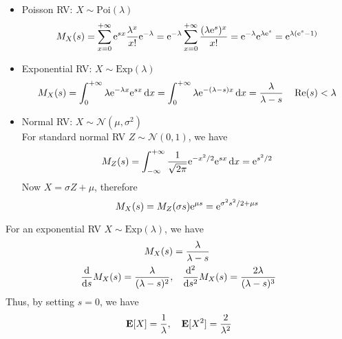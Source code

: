 \documentclass[device=normal, lang=en]{elegantbook}
\numberwithin{equation}{section}
\begin{document}
\begin{example}
    \begin{itemize}
        \item Poisson RV: $X \sim \text{Poi}(\lambda)$
        \begin{equation}
            M_{X}(s) = \sum_{x=0}^{+\infty} \mathrm{e}^{sx} \frac{\lambda^x}{x!} \mathrm{e}^{-\lambda} = \mathrm{e}^{-\lambda} \sum_{x=0}^{+\infty} \frac{(\lambda \mathrm{e}^{s})^x}{x!} = \mathrm{e}^{-\lambda} \mathrm{e}^{\lambda \mathrm{e}^{s}} = \mathrm{e}^{\lambda(\mathrm{e}^{s} - 1)}
        \end{equation}
        \item Exponential RV: $X \sim \text{Exp}(\lambda)$
        \begin{equation}
            M_{X}(s) = \int_{0}^{+\infty} \lambda \mathrm{e}^{-\lambda x} \mathrm{e}^{sx} \dd{x} = \int_{0}^{+\infty} \lambda \mathrm{e}^{-(\lambda - s)x} \dd{x} = \frac{\lambda}{\lambda - s} \quad \Re(s) < \lambda
        \end{equation}
        \item Normal RV: $X \sim \mathcal{N}(\mu, \sigma^2)$ \\ 
        For standard normal RV $Z \sim \mathcal{N}(0, 1)$, we have
        \begin{equation}
            M_{Z}(s) = \int_{-\infty}^{+\infty} \frac{1}{\sqrt{2\pi}} \mathrm{e}^{-x^2/2} \mathrm{e}^{sx} \dd{x} = \mathrm{e}^{s^2/2} 
        \end{equation}
        Now $X = \sigma Z + \mu$, therefore
        \begin{equation}
            M_{X}(s) = M_{Z}(\sigma s) \mathrm{e}^{\mu s} = \mathrm{e}^{\sigma^2 s^2/2+ \mu s}
        \end{equation}
    \end{itemize}
\end{example}

\begin{example}
    For an exponential RV $X \sim \text{Exp}(\lambda)$, we have
    \begin{equation}
    \begin{aligned}
        M_{X}(s) &= \frac{\lambda}{\lambda - s} \\ 
        \dv{s} M_{X}(s) = \frac{\lambda}{(\lambda - s)^2}, &\quad \dv[2]{s} M_{X}(s) = \frac{2\lambda}{(\lambda - s)^3}
    \end{aligned}
    \end{equation}
    Thus, by setting $s = 0$, we have
    \begin{equation}
        \mathbf{E}[X] = \frac{1}{\lambda}, \quad \mathbf{E}[X^2] = \frac{2}{\lambda^2}
    \end{equation}
\end{example}
\end{document}
